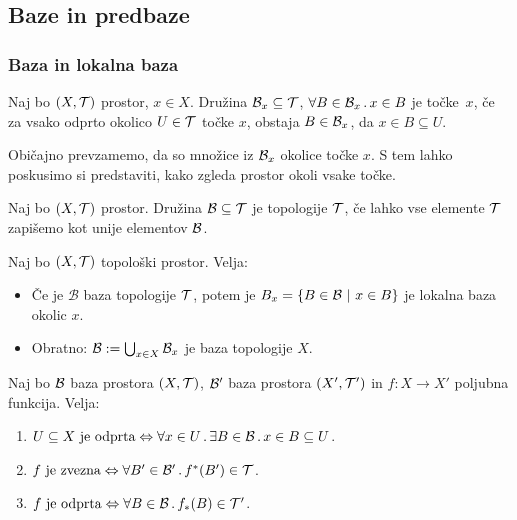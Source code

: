 \subsection{Baze in predbaze}
\subsubsection{Baza in lokalna baza}

\begin{definicija}
    Naj bo $(X, \mathcal{T})$ prostor, $x \in X$. Družina $\mathcal{B}_x \subseteq \mathcal{T}$, $\forall B \in \mathcal{B}_x \,.\, x \in B$ je  točke~$x$, če za vsako odprto okolico $U \in \mathcal{T}$ točke $x$, obstaja $B \in \mathcal{B}_x$, da $x \in B \subseteq U$.
\end{definicija}

\begin{opomba}
    Običajno prevzamemo, da so množice iz $\mathcal{B}_x$ okolice točke $x$. S tem lahko poskusimo si predstaviti, kako zgleda prostor okoli vsake točke.
\end{opomba}

\begin{definicija}
    Naj bo $(X, \mathcal{T})$ prostor. Družina $\mathcal{B} \subseteq \mathcal{T}$ je  topologije $\mathcal{T}$, če lahko vse elemente $\mathcal{T}$ zapišemo kot unije elementov $\mathcal{B}$.
\end{definicija}

\begin{trditev}
    Naj bo $(X, \mathcal{T})$ topološki prostor. Velja:
    \begin{itemize}
        \item  Če je $\mathcal{B}$ baza topologije $\mathcal{T}$, potem je $B_x = \left\{B \in \mathcal{B} \ | \ x \in B\right\}$ je lokalna baza okolic $x$.
        \item Obratno: $\mathcal{B} := \bigcup_{x \in X} \mathcal{B}_x$ je baza topologije $X$.
    \end{itemize}    
\end{trditev}

\newpage
\begin{trditev}
    Naj bo $\mathcal{B}$ baza prostora $(X, \mathcal{T})$, $\mathcal{B}'$ baza prostora $(X', \mathcal{T}')$ in $f: X \to X'$ poljubna funkcija. Velja:
    \begin{enumerate}
        \item $U \subseteq X \text{ je odprta} \Leftrightarrow \forall x \in U \,.\, \exists B \in \mathcal{B} \,.\, x \in B \subseteq U$.
        \item $f \text{ je zvezna} \Leftrightarrow \forall B' \in \mathcal{B}' \,.\, f^{*}(B') \in \mathcal{T}$.
        \item $f \text{ je odprta} \Leftrightarrow \forall B \in \mathcal{B} \,.\, f_{*}(B) \in \mathcal{T}'$.
    \end{enumerate}
\end{trditev}


